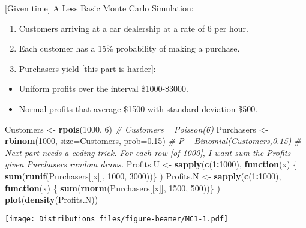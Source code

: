 \documentclass[ignorenonframetext,]{beamer}
\newenvironment{Shaded}{\begin{snugshade}}{\end{snugshade}}
\newcommand{\CommentTok}[1]{\textcolor[rgb]{0.56,0.35,0.01}{\textit{#1}}}
\newcommand{\ControlFlowTok}[1]{\textcolor[rgb]{0.13,0.29,0.53}{\textbf{#1}}}
\newcommand{\DataTypeTok}[1]{\textcolor[rgb]{0.13,0.29,0.53}{#1}}
\newcommand{\DecValTok}[1]{\textcolor[rgb]{0.00,0.00,0.81}{#1}}
\newcommand{\FloatTok}[1]{\textcolor[rgb]{0.00,0.00,0.81}{#1}}
\newcommand{\KeywordTok}[1]{\textcolor[rgb]{0.13,0.29,0.53}{\textbf{#1}}}
\newcommand{\NormalTok}[1]{#1}
\newcommand{\OperatorTok}[1]{\textcolor[rgb]{0.81,0.36,0.00}{\textbf{#1}}}
\newcommand{\StringTok}[1]{\textcolor[rgb]{0.31,0.60,0.02}{#1}}
\providecommand{\tightlist}{%
  \setlength{\itemsep}{0pt}\setlength{\parskip}{0pt}}
\begin{document}
\begin{frame}[fragile]{{[}Given time{]} A Less Basic Monte Carlo
Simulation:}
\protect\hypertarget{given-time-a-less-basic-monte-carlo-simulation}{}

\begin{enumerate}[<+->]
\tightlist
\item
  Customers arriving at a car dealership at a rate of 6 per hour.
\item
  Each customer has a 15\% probability of making a purchase.
\item
  Purchasers yield {[}this part is harder{]}:
\end{enumerate}

\begin{itemize}[<+->]
\tightlist
\item
  Uniform profits over the interval \$1000-\$3000.
\item
  Normal profits that average \$1500 with standard deviation \$500.
\end{itemize}

\begin{Shaded}
\begin{Highlighting}[]
\NormalTok{Customers <-}\StringTok{ }\KeywordTok{rpois}\NormalTok{(}\DecValTok{1000}\NormalTok{, }\DecValTok{6}\NormalTok{) }\CommentTok{# Customers ~ Poisson(6)}
\NormalTok{Purchasers <-}\StringTok{ }\KeywordTok{rbinom}\NormalTok{(}\DecValTok{1000}\NormalTok{, }\DataTypeTok{size=}\NormalTok{Customers, }\DataTypeTok{prob=}\FloatTok{0.15}\NormalTok{) }\CommentTok{# P ~ Binomial(Customers,0.15)}
\CommentTok{# Next part needs a coding trick.  For each row [of 1000], I want sum the Profits given Purchasers random draws.}
\NormalTok{Profits.U <-}\StringTok{ }\KeywordTok{sapply}\NormalTok{(}\KeywordTok{c}\NormalTok{(}\DecValTok{1}\OperatorTok{:}\DecValTok{1000}\NormalTok{), }\ControlFlowTok{function}\NormalTok{(x) \{ }\KeywordTok{sum}\NormalTok{(}\KeywordTok{runif}\NormalTok{(Purchasers[[x]], }\DecValTok{1000}\NormalTok{, }\DecValTok{3000}\NormalTok{))\} )}
\NormalTok{Profits.N <-}\StringTok{ }\KeywordTok{sapply}\NormalTok{(}\KeywordTok{c}\NormalTok{(}\DecValTok{1}\OperatorTok{:}\DecValTok{1000}\NormalTok{), }\ControlFlowTok{function}\NormalTok{(x) \{ }\KeywordTok{sum}\NormalTok{(}\KeywordTok{rnorm}\NormalTok{(Purchasers[[x]], }\DecValTok{1500}\NormalTok{, }\DecValTok{500}\NormalTok{))\} )}
\KeywordTok{plot}\NormalTok{(}\KeywordTok{density}\NormalTok{(Profits.N))}
\end{Highlighting}
\end{Shaded}

\texttt{[image: Distributions\_files/figure-beamer/MC1-1.pdf]}

\end{frame}
\end{document}
